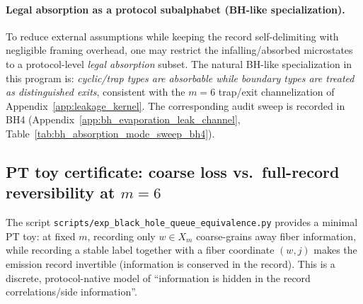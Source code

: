 %

\paragraph{Legal absorption as a protocol subalphabet (BH-like specialization).}
\AuditTag To reduce external assumptions while keeping the record self-delimiting with negligible framing overhead,
one may restrict the infalling/absorbed microstates to a protocol-level \emph{legal absorption} subset.
The natural BH-like specialization in this program is:
\emph{cyclic/trap types are absorbable while boundary types are treated as distinguished exits},
consistent with the $m=6$ trap/exit channelization of Appendix~\ref{app:leakage_kernel}.
The corresponding audit sweep is recorded in BH4 (Appendix~\ref{app:bh_evaporation_leak_channel},
Table~\ref{tab:bh_absorption_mode_sweep_bh4}).

\subsection{PT toy certificate: coarse loss vs.\ full-record reversibility at \texorpdfstring{$m=6$}{m=6}}
\label{subsec:bh5_pt_toy_certificate}

\AuditTag The script \texttt{scripts/exp\_black\_hole\_queue\_equivalence.py} provides a minimal PT toy:
at fixed $m$, recording only $w\in X_m$ coarse-grains away fiber information, while recording a stable label
together with a fiber coordinate $(w,j)$ makes the emission record invertible (information is conserved in the
record). This is a discrete, protocol-native model of ``information is hidden in the record correlations/side
information''.

